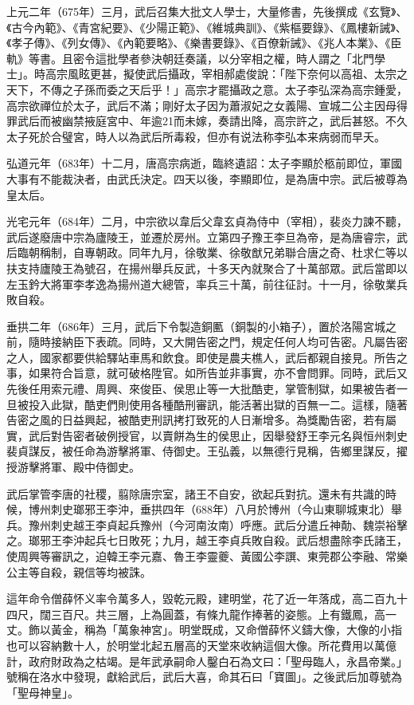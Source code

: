上元二年（675年）三月，武后召集大批文人學士，大量修書，先後撰成《玄覽》、《古今內範》、《青宮紀要》、《少陽正範》、《維城典訓》、《紫樞要錄》、《鳳樓新誡》、《孝子傳》、《列女傳》、《內範要略》、《樂書要錄》、《百僚新誡》、《兆人本業》、《臣軌》等書。且密令這批學者參決朝廷奏議，以分宰相之權，時人謂之「北門學士」。時高宗風眩更甚，擬使武后攝政，宰相郝處俊說：「陛下奈何以高祖、太宗之天下，不傳之子孫而委之天后乎！」高宗才罷攝政之意。太子李弘深為高宗鍾愛，高宗欲禪位於太子，武后不滿；剛好太子因为蕭淑妃之女義陽、宣城二公主因母得罪武后而被幽禁掖庭宮中、年逾21而未嫁，奏請出降，高宗許之，武后甚怒。不久太子死於合璧宮，時人以為武后所毒殺，但亦有说法称李弘本来病弱而早夭。

弘道元年（683年）十二月，唐高宗病逝，臨終遺詔：太子李顯於柩前即位，軍國大事有不能裁決者，由武氏決定。四天以後，李顯即位，是為唐中宗。武后被尊為皇太后。

光宅元年（684年）二月，中宗欲以韋后父韋玄貞為侍中（宰相），裴炎力諫不聽，武后遂廢唐中宗為廬陵王，並遷於房州。立第四子豫王李旦為帝，是為唐睿宗，武后臨朝稱制，自專朝政。同年九月，徐敬業、徐敬猷兄弟聯合唐之奇、杜求仁等以扶支持廬陵王為號召，在揚州舉兵反武，十多天內就聚合了十萬部眾。武后當即以左玉鈐大將軍李孝逸為揚州道大總管，率兵三十萬，前往征討。十一月，徐敬業兵敗自殺。

垂拱二年（686年）三月，武后下令製造銅匭（銅製的小箱子），置於洛陽宮城之前，隨時接納臣下表疏。同時，又大開告密之門，規定任何人均可告密。凡屬告密之人，國家都要供給驛站車馬和飲食。即使是農夫樵人，武后都親自接見。所告之事，如果符合旨意，就可破格陞官。如所告並非事實，亦不會問罪。同時，武后又先後任用索元禮、周興、來俊臣、侯思止等一大批酷吏，掌管制獄，如果被告者一旦被投入此獄，酷吏們則使用各種酷刑審訊，能活著出獄的百無一二。這樣，隨著告密之風的日益興起，被酷吏刑訊拷打致死的人日漸增多。為獎勵告密，若有屬實，武后對告密者破例授官，以賣餅為生的侯思止，因舉發舒王李元名與恒州刺史裴貞謀反，被任命為游擊將軍、侍御史。王弘義，以無德行見稱，告鄉里謀反，擢授游擊將軍、殿中侍御史。

武后掌管李唐的社稷，翦除唐宗室，諸王不自安，欲起兵對抗。還未有共識的時候，博州刺史瑯邪王李沖，垂拱四年（688年）八月於博州（今山東聊城東北）舉兵。豫州刺史越王李貞起兵豫州（今河南汝南）呼應。武后分遣丘神勣、魏崇裕擊之。瑯邪王李沖起兵七日敗死；九月，越王李貞兵敗自殺。武后想盡除李氏諸王，使周興等審訊之，迫韓王李元嘉、魯王李靈夔、黃國公李譔、東莞郡公李融、常樂公主等自殺，親信等均被誅。

這年命令僧薛怀义率令萬多人，毀乾元殿，建明堂，花了近一年落成，高二百九十四尺，闊三百尺。共三層，上為圓蓋，有條九龍作捧著的姿態。上有鐵鳳，高一丈。飾以黃金，稱為「萬象神宮」。明堂既成，又命僧薛怀义鑄大像，大像的小指也可以容納數十人，於明堂北起五層高的天堂來收納這個大像。所花費用以萬億計，政府財政為之枯竭。是年武承嗣命人鑿白石為文曰：「聖母臨人，永昌帝業。」號稱在洛水中發現，獻給武后，武后大喜，命其石曰「寶圖」。之後武后加尊號為「聖母神皇」。

